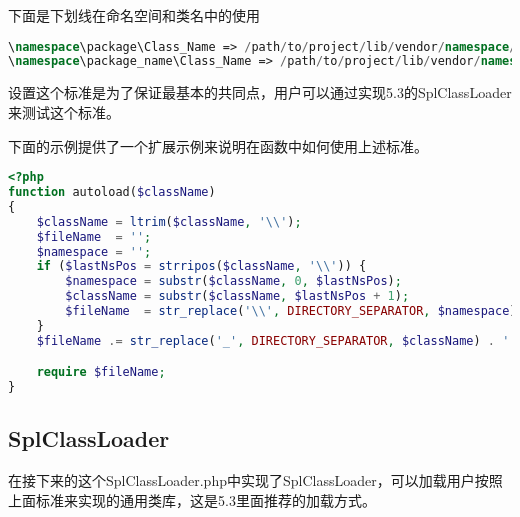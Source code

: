 下面是下划线在命名空间和类名中的使用


\begin{lstlisting}[language=PHP]
\namespace\package\Class_Name => /path/to/project/lib/vendor/namespace/package/Class/Name.php
\namespace\package_name\Class_Name => /path/to/project/lib/vendor/namespace/package_name/Class/Name.php
\end{lstlisting}

设置这个标准是为了保证最基本的共同点，用户可以通过实现5.3的SplClassLoader来测试这个标准。

下面的示例提供了一个扩展示例来说明在函数中如何使用上述标准。

\begin{lstlisting}[language=PHP]
<?php
function autoload($className)
{
    $className = ltrim($className, '\\');
    $fileName  = '';
    $namespace = '';
    if ($lastNsPos = strripos($className, '\\')) {
        $namespace = substr($className, 0, $lastNsPos);
        $className = substr($className, $lastNsPos + 1);
        $fileName  = str_replace('\\', DIRECTORY_SEPARATOR, $namespace) . DIRECTORY_SEPARATOR;
    }
    $fileName .= str_replace('_', DIRECTORY_SEPARATOR, $className) . '.php';

    require $fileName;
}
\end{lstlisting}

\subsection{SplClassLoader}


在接下来的这个SplClassLoader.php中实现了SplClassLoader，可以加载用户按照上面标准来实现的通用类库，这是5.3里面推荐的加载方式。

